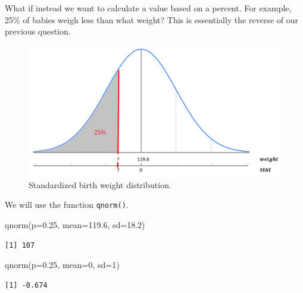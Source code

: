 \documentclass[
  letterpaper,
  DIV=11,
  numbers=noendperiod]{scrreprt}
\newenvironment{Shaded}{\begin{snugshade}}{\end{snugshade}}
\newcommand{\AttributeTok}[1]{\textcolor[rgb]{0.40,0.45,0.13}{#1}}
\newcommand{\DecValTok}[1]{\textcolor[rgb]{0.68,0.00,0.00}{#1}}
\newcommand{\FloatTok}[1]{\textcolor[rgb]{0.68,0.00,0.00}{#1}}
\newcommand{\FunctionTok}[1]{\textcolor[rgb]{0.28,0.35,0.67}{#1}}
\newcommand{\NormalTok}[1]{\textcolor[rgb]{0.00,0.23,0.31}{#1}}
\theoremstyle{definition}
\theoremstyle{remark}
\begin{document}
What if instead we want to calculate a value based on a percent. For
example, 25\% of babies weigh less than what weight? This is essentially
the reverse of our previous question.

\begin{figure}

{\centering \includegraphics{images/standardization4.png}

}

\caption{\label{fig-standardization4}Standardized birth weight
distribution.}

\end{figure}

We will use the function \texttt{qnorm()}.

\begin{Shaded}
\begin{Highlighting}[]
\FunctionTok{qnorm}\NormalTok{(}\AttributeTok{p=}\FloatTok{0.25}\NormalTok{, }\AttributeTok{mean=}\FloatTok{119.6}\NormalTok{, }\AttributeTok{sd=}\FloatTok{18.2}\NormalTok{)}
\end{Highlighting}
\end{Shaded}

\begin{verbatim}
[1] 107
\end{verbatim}

\begin{Shaded}
\begin{Highlighting}[]
\FunctionTok{qnorm}\NormalTok{(}\AttributeTok{p=}\FloatTok{0.25}\NormalTok{, }\AttributeTok{mean=}\DecValTok{0}\NormalTok{, }\AttributeTok{sd=}\DecValTok{1}\NormalTok{)}
\end{Highlighting}
\end{Shaded}

\begin{verbatim}
[1] -0.674
\end{verbatim}
\end{document}
